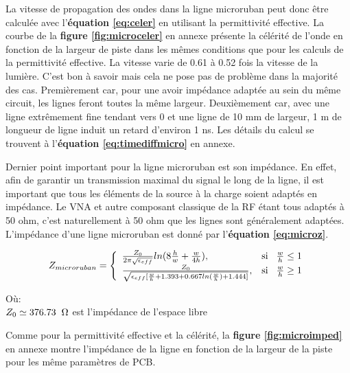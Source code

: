\documentclass[12pt]{article}
\begin{document}
\newpage
\vspace{0.5cm}
La vitesse de propagation des ondes dans la ligne microruban peut donc être calculée avec l'\textbf{équation \ref{eq:celer}} en utilisant la permittivité effective. La courbe de la \textbf{figure \ref{fig:microceler}} en annexe présente la célérité de l'onde en fonction de la largeur de piste dans les mêmes conditions que pour les calculs de la permittivité effective. La vitesse varie de 0.61 à 0.52 fois la vitesse de la lumière. C'est bon à savoir mais cela ne pose pas de problème dans la majorité des cas. Premièrement car, pour une avoir impédance adaptée au sein du même circuit, les lignes feront toutes la même largeur. Deuxièmement car, avec une ligne extrêmement fine tendant vers 0 et une ligne de 10 mm de largeur, 1 m de longueur de ligne induit un retard d'environ 1 ns. Les détails du calcul se trouvent à l'\textbf{équation \ref{eq:timediffmicro}} en annexe.

\vspace{0.5cm}
Dernier point important pour la ligne microruban est son impédance. En effet, afin de garantir un transmission maximal du signal le long de la ligne, il est important que tous les éléments de la source à la charge soient adaptés en impédance. Le VNA et autre composant classique de la RF étant tous adaptés à 50 ohm, c'est naturellement à 50 ohm que les lignes sont généralement adaptées. L’impédance d'une ligne microruban est donné par l'\textbf{équation \ref{eq:microz}}.

\vspace{0.5cm}
{\Large
\begin{equation}
Z_{microruban} = \left\{
\begin{array}{ll}
  \frac{Z_0}{2\pi\sqrt{\epsilon_{eff}}}ln(8\frac{h}{w}+\frac{w}{4h}), & \text{si} \hspace{0.3cm}\frac{w}{h}\leq 1\\
  \frac{Z_0}{\sqrt{\epsilon_{eff}[\frac{w}{h}+1.393+0.667ln(\frac{w}{h})+1.444]}}, & \text{si} \hspace{0.3cm}\frac{w}{h}\geq 1
\end{array}
\right.
\label{eq:microz}
\end{equation}}

\vspace{0.5cm}
Où: \\
$Z_0 \simeq 376.73 \hspace{0.2cm}\Omega$ est l’impédance de l'espace libre

\vspace{1cm}
Comme pour la permittivité effective et la célérité, la \textbf{figure \ref{fig:microimped}} en annexe montre l’impédance de la ligne en fonction de la largeur de la piste pour les même paramètres de PCB.
\end{document}
